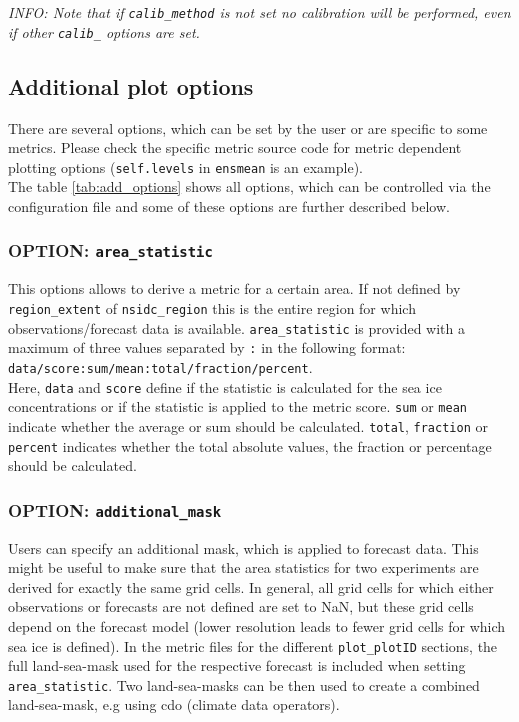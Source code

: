 \documentclass[DIV=10, parskip=full]{scrreprt}
\newcommand{\info}[1]{\textit{INFO: #1}}
\begin{document}
\info{Note that if \texttt{calib\_method} is not set no calibration will be performed, even if other \texttt{calib\_} options are set.}


\subsection{Additional plot options}\label{subsec:add_options}
There are several options, which can be set by the user or are specific to some metrics. Please check the specific metric source code for metric dependent plotting options (\texttt{self.levels} in \texttt{ensmean} is an example).\\

The table \ref{tab:add_options} shows all options, which can be controlled via the configuration file and some of these options are further described below.

\subsubsection{OPTION: \texttt{area\_statistic}}
This options allows to derive a metric for a certain area. If not defined by \texttt{region\_extent} of \texttt{nsidc\_region} this is the entire region for which observations/forecast data is available. \texttt{area\_statistic} is provided with a maximum of three values separated by \texttt{:} in the following format: \\

\texttt{data/score:sum/mean:total/fraction/percent}. \\

Here, \texttt{data} and \texttt{score} define if the statistic is calculated for the sea ice concentrations or if the statistic is applied to the metric score. \texttt{sum} or \texttt{mean} indicate whether the average or sum should be calculated. \texttt{total}, \texttt{fraction} or \texttt{percent} indicates whether the total absolute values, the fraction or percentage should be calculated.

\subsubsection{OPTION: \texttt{additional\_mask}}
Users can specify an additional mask, which is applied to forecast data. This might be useful to make sure that the area statistics for two experiments are derived for exactly the same grid cells. In general, all grid cells for which either observations or forecasts are not defined are set to NaN, but these grid cells depend on the forecast model (lower resolution leads to fewer grid cells for which sea ice is defined). In the metric files for the different \texttt{plot\_plotID} sections, the full land-sea-mask used for the respective forecast is included when setting \texttt{area\_statistic}. Two land-sea-masks can be then used to create a combined land-sea-mask, e.g using cdo (climate data operators).\\
\end{document}
